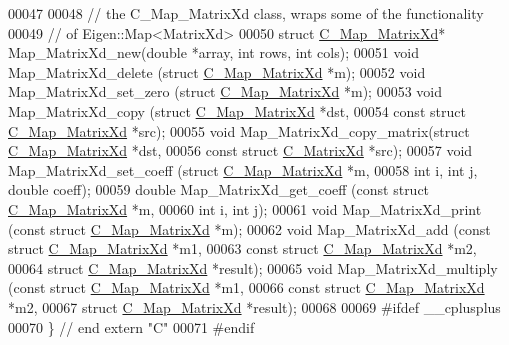 \begin{DoxyCode}
00047   
00048   \textcolor{comment}{// the C\_Map\_MatrixXd class, wraps some of the functionality}
00049   \textcolor{comment}{// of Eigen::Map<MatrixXd>}
00050   \textcolor{keyword}{struct }\hyperlink{struct_c___map___matrix_xd}{C\_Map\_MatrixXd}* Map\_MatrixXd\_new(\textcolor{keywordtype}{double} *array, \textcolor{keywordtype}{int} rows, \textcolor{keywordtype}{int} cols);
00051   \textcolor{keywordtype}{void}   Map\_MatrixXd\_delete     (\textcolor{keyword}{struct} \hyperlink{struct_c___map___matrix_xd}{C\_Map\_MatrixXd} *m);
00052   \textcolor{keywordtype}{void}   Map\_MatrixXd\_set\_zero   (\textcolor{keyword}{struct} \hyperlink{struct_c___map___matrix_xd}{C\_Map\_MatrixXd} *m);
00053   \textcolor{keywordtype}{void}   Map\_MatrixXd\_copy       (\textcolor{keyword}{struct} \hyperlink{struct_c___map___matrix_xd}{C\_Map\_MatrixXd} *dst,
00054                                   \textcolor{keyword}{const} \textcolor{keyword}{struct} \hyperlink{struct_c___map___matrix_xd}{C\_Map\_MatrixXd} *src);
00055   \textcolor{keywordtype}{void}   Map\_MatrixXd\_copy\_matrix(\textcolor{keyword}{struct} \hyperlink{struct_c___map___matrix_xd}{C\_Map\_MatrixXd} *dst,
00056                                   \textcolor{keyword}{const} \textcolor{keyword}{struct} \hyperlink{struct_c___matrix_xd}{C\_MatrixXd} *src);  
00057   \textcolor{keywordtype}{void}   Map\_MatrixXd\_set\_coeff  (\textcolor{keyword}{struct} \hyperlink{struct_c___map___matrix_xd}{C\_Map\_MatrixXd} *m,
00058                                   \textcolor{keywordtype}{int} i, \textcolor{keywordtype}{int} j, \textcolor{keywordtype}{double} coeff);
00059   \textcolor{keywordtype}{double} Map\_MatrixXd\_get\_coeff  (\textcolor{keyword}{const} \textcolor{keyword}{struct} \hyperlink{struct_c___map___matrix_xd}{C\_Map\_MatrixXd} *m,
00060                                   \textcolor{keywordtype}{int} i, \textcolor{keywordtype}{int} j);
00061   \textcolor{keywordtype}{void}   Map\_MatrixXd\_print      (\textcolor{keyword}{const} \textcolor{keyword}{struct} \hyperlink{struct_c___map___matrix_xd}{C\_Map\_MatrixXd} *m);
00062   \textcolor{keywordtype}{void}   Map\_MatrixXd\_add        (\textcolor{keyword}{const} \textcolor{keyword}{struct} \hyperlink{struct_c___map___matrix_xd}{C\_Map\_MatrixXd} *m1,
00063                                   \textcolor{keyword}{const} \textcolor{keyword}{struct} \hyperlink{struct_c___map___matrix_xd}{C\_Map\_MatrixXd} *m2,
00064                                   \textcolor{keyword}{struct} \hyperlink{struct_c___map___matrix_xd}{C\_Map\_MatrixXd} *result);  
00065   \textcolor{keywordtype}{void}   Map\_MatrixXd\_multiply   (\textcolor{keyword}{const} \textcolor{keyword}{struct} \hyperlink{struct_c___map___matrix_xd}{C\_Map\_MatrixXd} *m1,
00066                                   \textcolor{keyword}{const} \textcolor{keyword}{struct} \hyperlink{struct_c___map___matrix_xd}{C\_Map\_MatrixXd} *m2,
00067                                   \textcolor{keyword}{struct} \hyperlink{struct_c___map___matrix_xd}{C\_Map\_MatrixXd} *result);
00068 
00069 \textcolor{preprocessor}{#ifdef \_\_cplusplus}
00070 \} \textcolor{comment}{// end extern "C"}
00071 \textcolor{preprocessor}{#endif}
\end{DoxyCode}
